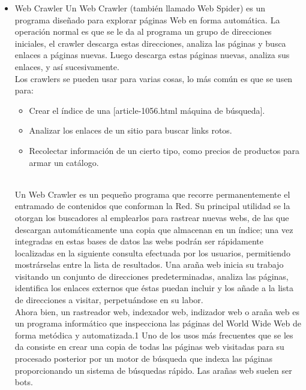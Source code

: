 	\begin{itemize}
		\item Web Crawler \newline
			Un Web Crawler (también llamado Web Spider) es un programa diseñado para explorar páginas Web en forma automática. La operación normal es que se le da al programa un grupo de direcciones iniciales, el crawler descarga estas direcciones, analiza las páginas y busca enlaces a páginas nuevas. Luego descarga estas páginas nuevas, analiza sus enlaces, y así sucesivamente.\cite{crawling} \\
			Los crawlers se pueden usar para varias cosas, lo más común es que se usen para:
				\begin{itemize}
					\item Crear el índice de una [article-1056.html máquina de búsqueda]. 
					\item Analizar los enlaces de un sitio para buscar links rotos. 
					\item Recolectar información de un cierto tipo, como precios de productos para armar un catálogo. \cite{craw}
				\end{itemize} \\
			
			Un Web Crawler es un pequeño programa que recorre permanentemente el entramado de contenidos que conforman la Red. Su principal utilidad se la otorgan los buscadores al emplearlos para rastrear nuevas webs, de las que descargan automáticamente una copia que almacenan en un índice; una vez integradas en estas bases de datos las webs podrán ser rápidamente localizadas en la siguiente consulta efectuada por los usuarios, permitiendo mostrárselas entre la lista de resultados.
			Una araña web inicia su trabajo visitando un conjunto de direcciones predeterminadas, analiza las páginas, identifica los enlaces externos que éstas puedan incluir y los añade a la lista de direcciones a visitar, perpetuándose en su labor.	\cite{web} \\
			
			Ahora bien, un rastreador web, indexador web, indizador web o araña web es un programa informático que inspecciona las páginas del World Wide Web de forma metódica y automatizada.1 Uno de los usos más frecuentes que se les da consiste en crear una copia de todas las páginas web visitadas para su procesado posterior por un motor de búsqueda que indexa las páginas proporcionando un sistema de búsquedas rápido. Las arañas web suelen ser bots. \cite{araña} \\
			

\end{itemize}

